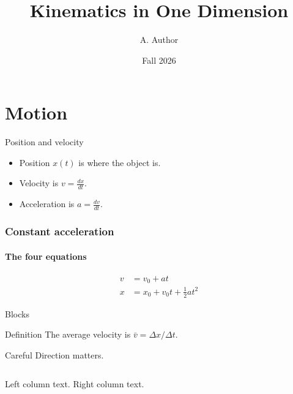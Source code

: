 \documentclass{beamer}
\title{Kinematics in One Dimension}
\author{A. Author}
\date{Fall 2026}
\begin{document}
\frame{\titlepage}
\section{Motion}
\begin{frame}{Position and velocity}
  \begin{itemize}
    \item Position $x(t)$ is where the object is.
    \pause
    \item Velocity is $v = \frac{dx}{dt}$.
    \pause
    \item Acceleration is $a = \frac{dv}{dt}$.
  \end{itemize}
\end{frame}
\begin{frame}
  \frametitle{Constant acceleration}
  \framesubtitle{The four equations}
  \begin{align*}
    v &= v_0 + a t \\
    x &= x_0 + v_0 t + \tfrac{1}{2} a t^2
  \end{align*}
\end{frame}
\begin{frame}{Blocks}
  \begin{block}{Definition}
    The average velocity is $\bar v = \Delta x / \Delta t$.
  \end{block}
  \begin{alertblock}{Careful}
    Direction matters.
  \end{alertblock}
  \begin{columns}
     Left column text.
     Right column text.
  \end{columns}
\end{frame}
\end{document}
